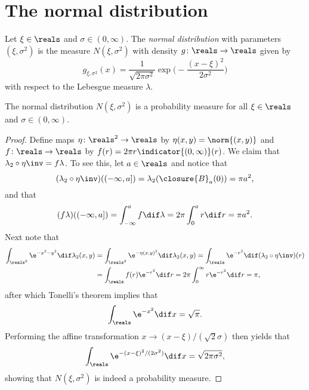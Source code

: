\documentclass[article, a4paper, 11pt, oneside]{memoir}
\numberwithin{equation}{chapter}
\begin{document}
\section{The normal distribution}

\begin{definition}
    Let $\xi \in \reals$ and $\sigma \in (0,\infty)$. The \emph{normal distribution} with parameters $(\xi,\sigma^2)$ is the measure $N(\xi,\sigma^2)$ with density $g \colon \reals \to \reals$ given by
    \begin{equation*}
        g_{\xi,\sigma^2}(x)
            = \frac{1}{\sqrt{2\pi\sigma^2}} \exp \biggl( - \frac{(x-\xi)^2}{2\sigma^2} \biggr)
    \end{equation*}
    with respect to the Lebesgue measure $\lambda$.
\end{definition}

\begin{lemma}
    The normal distribution $N(\xi,\sigma^2)$ is a probability measure for all $\xi \in \reals$ and $\sigma \in (0,\infty)$.
\end{lemma}

\begin{proof}
    Define maps $\eta \colon \reals^2 \to \reals$ by $\eta(x,y) = \norm{(x,y)}$ and $f \colon \reals \to \reals$ by $f(r) = 2\pi r \indicator{(0,\infty)}(r)$. We claim that $\lambda_2 \circ \eta\inv = f \lambda$. To see this, let $a \in \reals$ and notice that
    \begin{equation*}
        (\lambda_2 \circ \eta\inv)((-\infty,a])
            = \lambda_2(\closure{B}_a(0))
            = \pi a^2,
    \end{equation*}
    and that
    \begin{equation*}
        (f\lambda)((-\infty,a])
            = \int_{-\infty}^a f \dif \lambda
            = 2\pi \int_0^a r \dif r
            = \pi a^2.
    \end{equation*}
    Next note that
    \begin{align*}
        \int_{\reals^2} \e^{-x^2-y^2} \dif \lambda_2(x,y)
            &= \int_{\reals^2} \e^{-\eta(x,y)^2} \dif \lambda_2(x,y)
             = \int_\reals \e^{-r^2} \dif (\lambda_2 \circ \eta\inv)(r) \\
            &= \int_\reals f(r) \e^{-r^2} \dif r
             = 2\pi \int_0^\infty r \e^{-r^2} \dif r
             = \pi,
    \end{align*}
    after which Tonelli's theorem implies that
    \begin{equation*}
        \int_\reals \e^{-x^2} \dif x
            = \sqrt{\pi}.
    \end{equation*}
    Performing the affine transformation $x \to (x-\xi)/(\sqrt{2}\sigma)$ then yields that
    \begin{equation*}
        \int_\reals \e^{-(x-\xi)^2/(2\sigma^2)} \dif x
            = \sqrt{2\pi\sigma^2},
    \end{equation*}
    showing that $N(\xi,\sigma^2)$ is indeed a probability measure.
\end{proof}
\end{document}
